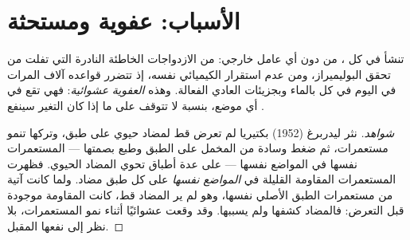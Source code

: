 \section{الأسباب: عفوية ومستحثة}

\begin{proposition}\label{prop:g11:mutations:spontaneous}
تنشأ  في كل ، من دون أي عامل خارجي: من الازدواجات الخاطئة
النادرة التي تفلت من تحقق البوليميراز، ومن عدم استقرار  الكيميائي
نفسه، إذ تتضرر قواعده آلاف المرات في اليوم في كل  بالماء وبجزيئات
 العادي الفعالة. وهذه \emph{ العفوية}
\emph{عشوائية}: فهي تقع في أي موضع، بنسبة لا تتوقف على ما إذا كان
التغير سينفع .
\end{proposition}
\begin{proof}[شواهد]
نثر ليدربرغ (1952) بكتيريا لم تعرض قط لمضاد حيوي على طبق، وتركها تنمو
مستعمرات، ثم ضغط وسادة من المخمل على الطبق وطبع بصمتها --- المستعمرات
نفسها في المواضع نفسها --- على عدة أطباق تحوي المضاد الحيوي. فظهرت
المستعمرات المقاومة القليلة في \emph{المواضع نفسها} على كل طبق مضاد.
ولما كانت آتية من مستعمرات الطبق الأصلي نفسها، وهو لم ير المضاد قط،
كانت  المقاومة موجودة قبل التعرض: فالمضاد كشفها ولم يسببها. وقد
وقعت  عشوائيًا أثناء نمو المستعمرات، بلا نظر إلى نفعها المقبل.
\end{proof}


